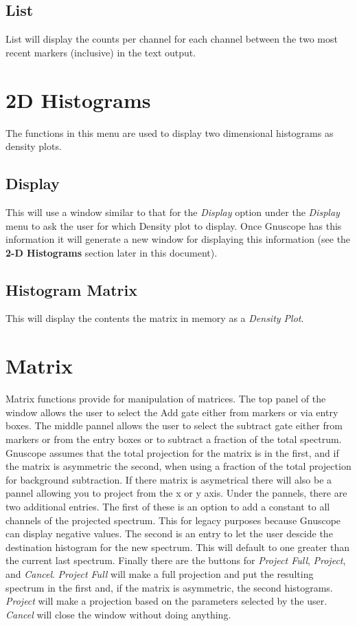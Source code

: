 \subsection{List}

List will display the counts per channel for each channel between the two most recent markers (inclusive) in the text output.

\section{2D Histograms}

The functions in this menu are used to display two dimensional histograms as density plots.

\subsection{Display}

This will use a window similar to that for the {\it Display} option under the {\it Display} menu to ask the user for which Density plot to display.  Once Gnuscope has this information it will generate a new window for displaying this information (see the {\bf 2-D Histograms} section later in this document).

\subsection{Histogram Matrix}

This will display the contents the matrix in memory as a {\it Density Plot}.

\section{Matrix}

Matrix functions provide for manipulation of matrices.  The top panel of the window allows the user to select the Add gate either from markers or via entry boxes.  The middle pannel allows the user to select the subtract gate either from markers or from the entry boxes or to subtract a fraction of the total spectrum.  Gnuscope assumes that the total projection for the matrix is in the first, and if the matrix is asymmetric the second, when using a fraction of the total projection for background subtraction.  If there matrix is asymetrical there will also be a pannel allowing you to project from the x or y axis.  Under the pannels, there are two additional entries.  The first of these is an option to add a constant to all channels of the projected spectrum.  This for legacy purposes because Gnuscope can display negative values.  The second is an entry to let the user descide the destination histogram for the new spectrum.  This will default to one greater than the current last spectrum.  Finally there are the buttons for {\it Project Full}, {\it Project}, and {\it Cancel}.  {\it Project Full} will make a full projection and put the resulting spectrum in the first and, if the matrix is asymmetric, the second histograms.  {\it Project} will make a projection based on the parameters selected by the user.  {\it Cancel} will close the window without doing anything.



